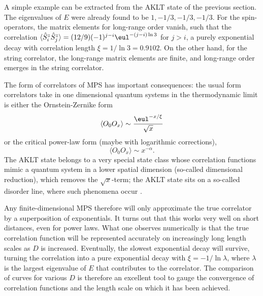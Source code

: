A simple example can be extracted from the AKLT state of the previous section. The eigenvalues of $E$ were already found to be $1,-1/3,-1/3,-1/3$.  For the spin-operators, the matrix elements for long-range order vanish, such that the correlation $\langle \hat{S}_i^z \hat{S}_j^z \rangle = (12/9)(-1)^{j-i} \eul^{-(j-i)\ln 3}$ for $j>i$, a purely exponential decay with correlation length $\xi = 1/\ln 3= 0.9102$. On the other hand, for the string correlator, the long-range matrix elements are finite, and long-range order emerges in the string correlator.

The form of correlators of MPS has important consequences: the usual form correlators take in one dimensional quantum systems in the thermodynamic limit is either the Ornstein-Zernike form
\begin{equation}
\langle O_0 O_x \rangle \sim \frac{\eul^{-x/\xi}}{\sqrt{x}}
\end{equation}
or the critical power-law form (maybe with logarithmic corrections),
\begin{equation}
\langle O_0 O_x \rangle \sim x^{-\alpha} .
\end{equation}
The AKLT state belongs to a very special state class whose correlation functions mimic a quantum system in a lower spatial dimension (so-called dimensional reduction), which removes the $\sqrt{x}$-term; the AKLT state sits on a so-called disorder line, where such phenomena occur \cite{Garel96}. 

Any finite-dimensional MPS therefore will only approximate the true correlator by a superposition of exponentials. It turns out that this works very well on short distances, even for power laws. What one observes numerically is that the true correlation function will be represented accurately on increasingly long length scales as $D$ is increased. Eventually, the slowest exponential decay will survive, turning the correlation into a pure exponential decay with $\xi =  -1/\ln \lambda$, where $\lambda$ is the largest eigenvalue of $E$ that contributes to the correlator. The comparison of curves for various $D$ is therefore an excellent tool to gauge the convergence of correlation functions and the length scale on which it has been achieved.  

